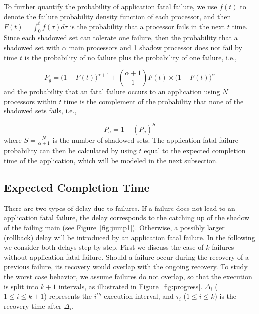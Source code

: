 To further quantify the probability of application fatal failure, we use 
$f(t)$ to denote the failure probability density function of each processor, and then $F(t) = \int_0^tf(\tau)d\tau$ is the probability that a processor fails in the next $t$ time. 
Since each shadowed set can tolerate one failure, 
then the probability that a shadowed set with $\alpha$ main processors and 1 shadow processor does not fail by time $t$ is the probability of no failure plus the probability of one failure, i.e., 

\begin{equation}
	P_g = \Big(1-F(t)\Big)^{\alpha+1} + {{\alpha+1} \choose 1}F(t)\times \Big(1-F(t)\Big)^{\alpha}
\end{equation}
and the probability that an fatal failure occurs to an application using $N$ processors within $t$ time is the complement of the probability that
none of the shadowed sets fails, i.e.,

\begin{equation}
	P_a = 1 - ({P_g})^{S}
\end{equation}
where $S=\frac{N}{\alpha+1}$ is the number of shadowed sets.
The application fatal failure probability can then be calculated by using $t$ equal to the expected completion time of the application, which will be modeled in the next subsection.

\subsection{Expected Completion Time}
\label{sec:anal_time}
There are two types of delay due to failures. If a failure does not lead to an application fatal failure, the delay corresponds to the catching up of the shadow of the failing main (see Figure~\ref{fig:jump1}). Otherwise, a possibly larger (rollback) delay will be introduced by an application fatal failure. In the following we consider both delays step by step. 
First we discuss the case of $k$ failures without application fatal failure. Should a failure occur during the recovery of a previous failure, its recovery would overlap with the ongoing recovery. To study the worst case behavior, we assume failures do not overlap, so that the execution is split into $k+1$ intervals, as illustrated in Figure~\ref{fig:progress}. 
$\Delta_i$ ($1\le i \le k+1$) represents the $i^{th}$ execution interval, and $\tau_i$ ($1\le i \le k$) is the recovery time after $\Delta_i$. 


